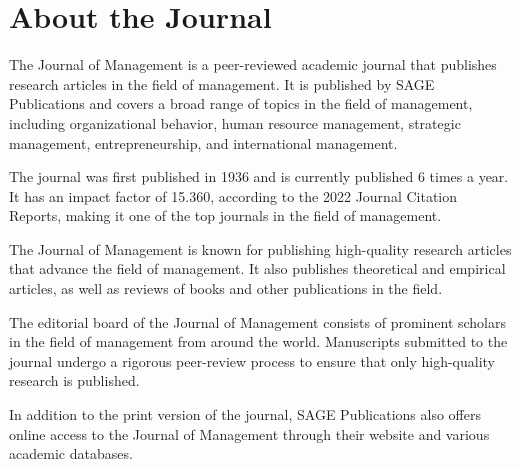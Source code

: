 \newpage

\section*{About the Journal}

The Journal of Management is a peer-reviewed academic journal that publishes research articles in the field of management. It is published by SAGE Publications and covers a broad range of topics in the field of management, including organizational behavior, human resource management, strategic management, entrepreneurship, and international management.

The journal was first published in 1936 and is currently published 6 times a year. It has an impact factor of 15.360, according to the 2022 Journal Citation Reports, making it one of the top journals in the field of management.

The Journal of Management is known for publishing high-quality research articles that advance the field of management. It also publishes theoretical and empirical articles, as well as reviews of books and other publications in the field.

The editorial board of the Journal of Management consists of prominent scholars in the field of management from around the world. Manuscripts submitted to the journal undergo a rigorous peer-review process to ensure that only high-quality research is published.

In addition to the print version of the journal, SAGE Publications also offers online access to the Journal of Management through their website and various academic databases.

